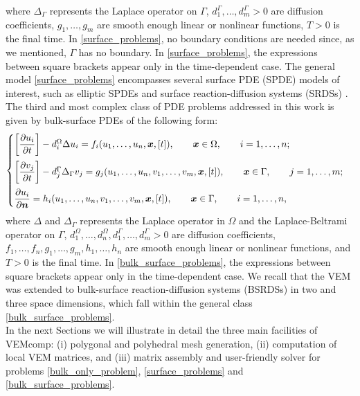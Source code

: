 \documentclass[a4paper]{article}
\newcommand{\boldn}{\boldsymbol{n}}
\newcommand{\boldx}{\boldsymbol{x}}
\begin{document}
where $\Delta_\Gamma$ represents the Laplace operator on $\Gamma$, $d_1^\Gamma,\dots, d_m^\Gamma > 0$ are diffusion coefficients,  $g_1, \dots, g_m$ are smooth enough linear or nonlinear functions, $T>0$ is the final time.  In \eqref{surface_problems}, no boundary conditions are needed since, as we mentioned, $\Gamma$ has no boundary. In \eqref{surface_problems}, the expressions between square brackets appear only in the time-dependent case. The general model \eqref{surface_problems} encompasses several surface PDE (SPDE) models of interest, such as elliptic SPDEs \cite{bachini2021arbitrary, frittelli2018virtual} and surface reaction-diffusion systems (SRDSs) \cite{lacitignola2017turing, lacitignola2022pattern}.\\
The third and most complex class of PDE problems addressed in this work is given by bulk-surface PDEs of the following form:
\begin{equation}
\label{bulk_surface_problems}
\begin{cases}
\vspace*{2mm}
\left[\dfrac{\partial u_i}{\partial t}\right] - d_i^\Omega \Delta u_i = f_i(u_1,\dots,u_n, \boldx, [t]),  \qquad \boldx \in\Omega,\qquad i=1,\dots, n;\\
\vspace*{2mm}
\left[\dfrac{\partial v_j}{\partial t}\right] - d_j^\Gamma \Delta_\Gamma v_j = g_j(u_1,\dots,u_n, v_1,\dots, v_m,\boldx, [t]), \qquad \boldx \in \Gamma,\qquad j=1,\dots,m;\\
\dfrac{\partial u_i}{\partial \boldn} = h_i(u_1,\dots,u_n,v_1,\dots,v_m,\boldx, [t]), \qquad \boldx \in \Gamma,\qquad i=1,\dots,n,
\end{cases}
\end{equation}
where $\Delta$ and $\Delta_\Gamma$ represents the Laplace operator in $\Omega$ and the Laplace-Beltrami operator on $\Gamma$, $d_1^\Omega,\dots, d_n^\Omega,  d_1^\Gamma,\dots, d_m^\Gamma > 0$ are diffusion coefficients,  $f_1, \dots, f_n, g_1,\dots,g_m,h_1,\dots,h_n$ are smooth enough linear or nonlinear functions, and $T>0$ is the final time.  In \eqref{bulk_surface_problems}, the expressions between square brackets appear only in the time-dependent case.  We recall that the VEM was extended to bulk-surface reaction-diffusion systems (BSRDSs) in two \cite{frittelli2021bulk} and three \cite{frittelli2023bsrds} space dimensions, which fall within the general class \eqref{bulk_surface_problems}. \\
In the next Sections we will illustrate in detail the three main facilities of VEMcomp: (i) polygonal and polyhedral mesh generation, (ii) computation of local VEM matrices, and (iii)  matrix assembly and user-friendly solver for problems \eqref{bulk_only_problem}, \eqref{surface_problems} and \eqref{bulk_surface_problems}.
\end{document}
